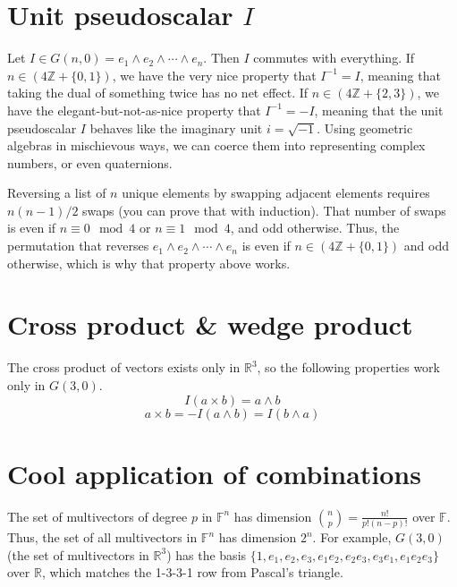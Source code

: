 \documentclass[12pt]{article}
\begin{document}
\section{Unit pseudoscalar $I$}
Let $I \in G(n, 0) = e_1 \wedge e_2 \wedge \cdots \wedge e_n$. Then $I$ commutes with everything. If $n \in (4 \mathbb{Z} + \{0, 1\})$, we have the very nice property that $I^{-1} = I$, meaning that taking the dual of something twice has no net effect. If $n \in (4 \mathbb{Z} + \{2, 3\})$, we have the elegant-but-not-as-nice property that $I^{-1} = -I$, meaning that the unit pseudoscalar $I$ behaves like the imaginary unit $i = \sqrt{-1}$. Using geometric algebras in mischievous ways, we can coerce them into representing complex numbers, or even quaternions.

Reversing a list of $n$ unique elements by swapping adjacent elements requires $n(n-1)/2$ swaps (you can prove that with induction). That number of swaps is even if $n \equiv 0 \mod{4}$ or $n \equiv 1 \mod{4}$, and odd otherwise. Thus, the permutation that reverses $e_1 \wedge e_2 \wedge \cdots \wedge e_n$ is even if $n \in (4 \mathbb{Z} + \{0, 1\})$ and odd otherwise, which is why that property above works.

\section{Cross product \& wedge product}
The cross product of vectors exists only in $\mathbb{R}^3$, so the following properties work only in $G(3, 0)$.
\[I (a \times b) = a \wedge b\]
\[a \times b = -I (a \wedge b) = I (b \wedge a)\]


\section{Cool application of combinations}
The set of multivectors of degree $p$ in $\mathbb{F}^n$ has dimension ${n \choose p} = \frac{n!}{p!(n-p)!} $ over $\mathbb{F}$. Thus, the set of all multivectors in $\mathbb{F}^n$ has dimension $2^n$. For example, $G(3,0)$ (the set of multivectors in $\mathbb{R}^3$) has the basis $\{1, e_1, e_2, e_3, e_1 e_2, e_2 e_3, e_3 e_1, e_1 e_2 e_3\}$ over $\mathbb{R}$, which matches the 1-3-3-1 row from Pascal's triangle.
\end{document}
